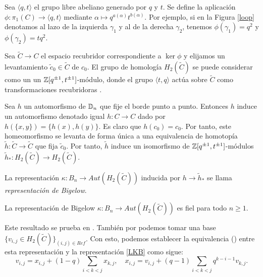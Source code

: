 \documentclass[TFG.tex]{subfiles}
\begin{document}


Sea $\langle q,t\rangle$ el grupo libre abeliano  generado por $q$ y $t$. Se define la aplicación $\phi:\pi_1(C)\to\langle q,t\rangle$ mediante $\alpha\mapsto q^{a(\alpha)}t^{b(\alpha)}$. Por ejemplo, si en la Figura \ref{loop} denotamos al lazo de la izquierda $\gamma_1$ y al de la derecha $\gamma_2$, tenemos $\phi(\gamma_1)=q^2$ y $\phi(\gamma_2)=tq^2$. 

Sea $\widetilde{C}\to C$ el espacio recubridor correspondiente a $\ker\phi$ y elijamos un levantamiento $\tilde{c}_0\in\widetilde{C}$ de $c_0$. El grupo de homología $H_2(\widetilde{C})$ se puede considerar como un un $\mathbb{Z}[q^{\pm 1},t^{\pm 1}]$-módulo, donde el grupo $\langle t,q\rangle$ actúa sobre $\widetilde{C}$ como transformaciones recubridoras \cite{Bigelow}.

Sea $h$ un automorfismo de $\mathbb{D}_n$ que fije el borde punto a punto. Entonces $h$ induce un automorfismo denotado igual $h:C\to C$ dado por $h(\{x,y\})=\{h(x),h(y)\}$. Es claro que $h(c_0)=c_0$. Por tanto, este homeomorfismo se levanta de forma única a una equivalencia de homotopía $\tilde{h}:\widetilde{C}\to\widetilde{C}$ que fija $\tilde{c}_0$. Por tanto, $\tilde{h}$ induce un isomorfismo de $\mathbb{Z}[q^{\pm 1},t^{\pm 1}]$-módulos $\tilde{h}_*:H_2(\widetilde{C})\to H_2(\widetilde{C})$.


\begin{defi}
La representación $\kappa:B_n\to Aut(H_2(\widetilde{C}))$ inducida por $h\to\tilde{h}_*$ se llama \emph{representación de Bigelow}.
\end{defi}

\begin{teorema}
La representación de Bigelow $\kappa:B_n\to Aut(H_2(\widetilde{C}))$ es fiel para todo $n\geq 1$.
\end{teorema}

Este resultado se prueba en \cite{Bil}. También por \cite{Bil} podemos tomar una base $\{v_{i,j}\in H_2(\widetilde{C})\}_{(i,j)\in Ref}$. Con esto, podemos establecer la equivalencia (\cite{nundam}) entre esta representación y la representación  \ref{LKB} como sigue:
\[
v_{i,j}=x_{i,j}+(1-q)\sum_{i<k<j}x_{k,j},\quad x_{i,j}=v_{i,j}+(q-1)\sum_{i<k<j}q^{k-i-1}v_{k,j}.
\]
\end{document}
